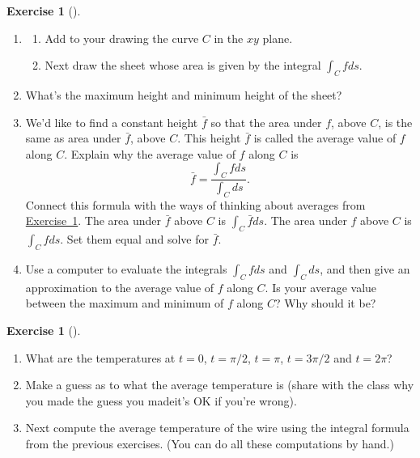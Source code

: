 \documentclass[10pt,]{book}
\theoremstyle{plain}
\theoremstyle{definition}
\theoremstyle{definition}
\theoremstyle{definition}
\theoremstyle{definition}
\newtheorem{exploration}[project]{Exercise}
\theoremstyle{definition}
\numberwithin{equation}{section}
\begin{document}
\begin{exploration}[]\label{Average_Value_intro}
\leavevmode%
\begin{enumerate}[font=\bfseries,label=(\alph*),ref=\alph*]
\item\label{task-548} \begin{enumerate}[font=\bfseries,label=(\roman*),ref=\theenumi.\roman*]
\item\label{task-549} Add to your drawing the curve \(C\) in the \(xy\) plane.%
\item\label{task-550} Next draw the sheet whose area is given by the integral \(\int_C f ds\).%
\end{enumerate}
\item\label{task-551} What's the maximum height and minimum height of the sheet?  %
\item\label{task-552} We'd like to find a constant height \(\bar f\) so that the area under \(f\), above \(C\), is the same as area under \(\bar f\), above \(C\). This height \(\bar f\) is called the average value of \(f\) along \(C\). Explain why the average value of \(f\) along \(C\) is%
\begin{equation*}
\bar f = \frac{\int_C f ds}{\int_C ds}.
\end{equation*}
Connect this formula with the ways of thinking about averages from \hyperref[average_value_methods]{Exercise~1}. The area under \(\bar f\) above \(C\) is \(\int_C \bar f ds\). The area under \(f\) above \(C\) is \(\int_C f ds\). Set them equal and solve for \(\bar f\).%
%
\item\label{task-553} Use a computer to evaluate the integrals \(\int_C f ds\) and \(\int_C ds\), and then give an approximation to the average value of \(f\) along \(C\). Is your average value between the maximum and minimum of \(f\) along \(C\)? Why should it be?%
\end{enumerate}
\end{exploration}
\begin{exploration}[]\label{exploration-215}
\leavevmode%
\begin{enumerate}[font=\bfseries,label=(\alph*),ref=\alph*]
\item\label{task-554} What are the temperatures at \(t=0\), \(t=\pi/2\), \(t=\pi\), \(t=3\pi/2\) and \(t=2\pi\)?%
\item\label{task-555} Make a guess as to what the average temperature is (share with the class why you made the guess you made\textemdash{}it's OK if you're wrong).%
\item\label{task-556} Next compute the average temperature of the wire using the integral formula from the previous exercises. (You can do all these computations by hand.)%
\end{enumerate}
\end{exploration}
\typeout{************************************************}
\typeout{************************************************}
\end{document}
